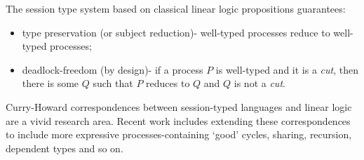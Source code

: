 \documentclass[a4paper, openany]{memoir}
\theoremstyle{definition}
\begin{document}
    The session type system based on classical linear logic propositions guarantees:
    \begin{itemize}
        \item type preservation (or subject reduction)- well-typed processes reduce to well-typed processes;
        \item deadlock-freedom (by design)- if a process $P$ is well-typed and it is a \emph{cut}, then there is some $Q$ such that $P$ reduces to $Q$ and $Q$ is not a \emph{cut}.
    \end{itemize}

    Curry-Howard correspondences between session-typed languages and linear logic are a vivid research area. Recent work includes extending these correspondences to include more expressive processes-containing `good' cycles, sharing, recursion, dependent types and so on.
\end{document}

